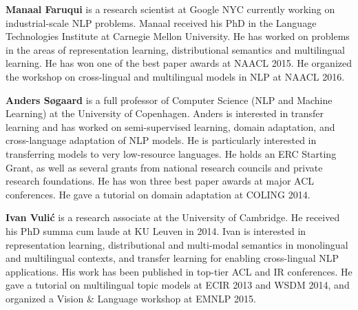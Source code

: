 \begin{bio}
\small
\textbf{Manaal Faruqui} is a research scientist at Google NYC currently working on industrial-scale NLP problems. Manaal received his PhD in the Language Technologies Institute at Carnegie Mellon University. He has worked on problems in the areas of representation learning, distributional semantics and multilingual learning. He has won one of the best paper awards at NAACL 2015. He organized the workshop on cross-lingual and multilingual models in NLP at NAACL 2016.

\textbf{Anders Søgaard} is a full professor of Computer Science (NLP and Machine Learning) at the University of Copenhagen. Anders is interested in transfer learning and has worked on semi-supervised learning, domain adaptation, and cross-language adaptation of NLP models. He is particularly interested in transferring models to very low-resource languages. He holds an ERC Starting Grant, as well as several grants from national research councils and private research foundations. He has won three best paper awards at major ACL conferences. He gave a tutorial on domain adaptation at COLING 2014.

\textbf{Ivan Vulić} is a research associate at the University of Cambridge. He received his PhD summa cum laude at KU Leuven in 2014. Ivan is interested in representation learning, distributional and multi-modal semantics in monolingual and multilingual contexts, and transfer learning for enabling cross-lingual NLP applications. His work has been published in top-tier ACL and IR conferences. He gave a tutorial on multilingual topic models at ECIR 2013 and WSDM 2014, and organized a Vision \& Language workshop at EMNLP 2015.
\end{bio}

